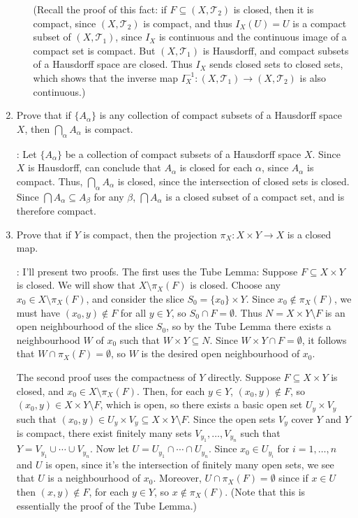 \documentclass[letterpaper,12pt]{article}
\newcommand{\T}{\mathcal{T}}
\begin{document}
\begin{enumerate}
\begin{enumerate}
(Recall the proof of this fact: if $F\subseteq (X,\T_2)$ is closed, then it is compact, since $(X,\T_2)$ is compact, and thus $I_X(U)=U$ is a compact subset of $(X,\T_1)$, since $I_X$ is continuous and the continuous image of a compact set is compact. But $(X,\T_1)$ is Hausdorff, and compact subsets of a Hausdorff space are closed. Thus $I_X$ sends closed sets to closed sets, which shows that the inverse map $I_X^{-1}:(X,\T_1)\to (X,\T_2)$ is also continuous.)

\bigskip

\end{enumerate}
 \item Prove that if $\{A_\alpha\}$ is any collection of compact subsets of a Hausdorff space $X$, then $\bigcap_\alpha A_\alpha$ is compact.

\bigskip

: Let $\{A_\alpha\}$ be a collection of compact subsets of a Hausdorff space $X$. Since $X$ is Hausdorff, can conclude that $A_\alpha$ is closed for each $\alpha$, since $A_\alpha$ is compact. Thus, $\bigcap_\alpha A_\alpha$ is closed, since the intersection of closed sets is closed. Since $\bigcap A_\alpha\subseteq A_\beta$ for any $\beta$, $\bigcap A_\alpha$ is a closed subset of a compact set, and is therefore compact.

\bigskip

 \item Prove that if $Y$ is compact, then the projection $\pi_X: X\times Y\to X$ is a closed map.

\bigskip

: I'll present two proofs. The first uses the Tube Lemma: Suppose $F\subseteq X\times Y$ is closed. We will show that $X\setminus \pi_X(F)$ is closed. Choose any $x_0\in X\setminus \pi_X(F)$, and consider the slice $S_0=\{x_0\}\times Y$. Since $x_0\notin\pi_X(F)$, we must have $(x_0,y)\notin F$ for all $y\in Y$, so $S_0\cap F = \emptyset$. Thus $N=X\times Y\setminus F$ is an open neighbourhood of the slice $S_0$, so by the Tube Lemma there exists a neighbourhood $W$ of $x_0$ such that $W\times Y\subseteq N$. Since $W\times Y\cap F=\emptyset$, it follows that $W\cap \pi_X(F) = \emptyset$, so $W$ is the desired open neighbourhood of $x_0$.

The second proof uses the compactness of $Y$ directly. Suppose $F\subseteq X\times Y$ is closed, and $x_0\in X\setminus \pi_X(F)$. Then, for each $y\in Y$, $(x_0,y)\notin F$, so $(x_0,y)\in X\times Y\setminus F$, which is open, so there exists a basic open set $U_y\times V_y$ such that $(x_0,y)\in U_y\times V_y\subseteq X\times Y\setminus F$. Since the open sets $V_y$ cover $Y$ and $Y$ is compact, there exist finitely many sets $V_{y_1},\ldots, V_{y_n}$ such that $Y=V_{y_1}\cup\cdots\cup V_{y_n}$. Now let $U=U_{y_1}\cap\cdots\cap U_{y_n}$. Since $x_0\in U_{y_i}$ for $i=1,\ldots, n$ and $U$ is open, since it's the intersection of finitely many open sets, we see that $U$ is a neighbourhood of $x_0$. Moreover, $U\cap\pi_X(F)=\emptyset$ since if $x\in U$ then $(x,y)\notin F$, for each $y\in Y$, so $x\notin\pi_X(F)$. (Note that this is essentially the proof of the Tube Lemma.)


\end{enumerate}
\end{document}
